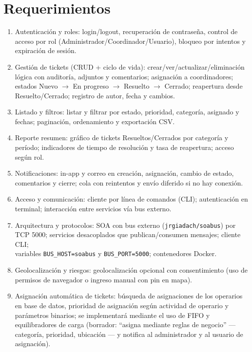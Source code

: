 \documentclass[letter,12pt]{article}
\begin{document}
\section{Requerimientos}
\begin{enumerate}[leftmargin=*]
    \item Autenticación y roles: login/logout, recuperación de contraseña, control de acceso por rol (Administrador/Coordinador/Usuario), bloqueo por intentos y expiración de sesión.
    \item Gestión de tickets (CRUD + ciclo de vida): crear/ver/actualizar/eliminación lógica con auditoría, adjuntos y comentarios; asignación a coordinadores; estados Nuevo $\rightarrow$ En progreso $\rightarrow$ Resuelto $\rightarrow$ Cerrado; reapertura desde Resuelto/Cerrado; registro de autor, fecha y cambios.
    \item Listado y filtros: listar y filtrar por estado, prioridad, categoría, asignado y fechas; paginación, ordenamiento y exportación CSV.
    \item Reporte resumen: gráfico de tickets Resueltos/Cerrados por categoría y período; indicadores de tiempo de resolución y tasa de reapertura; acceso según rol.
    \item Notificaciones: in-app y correo en creación, asignación, cambio de estado, comentarios y cierre; cola con reintentos y envío diferido si no hay conexión.
    \item Acceso y comunicación: cliente por línea de comandos (CLI); autenticación en terminal; interacción entre servicios vía bus externo.
    \item Arquitectura y protocolos: SOA con bus externo (\texttt{jrgiadach/soabus}) por TCP 5000; servicios desacoplados que publican/consumen mensajes; cliente CLI;\\
    \hspace*{1.5em}variables \texttt{BUS\_HOST=soabus} y \texttt{BUS\_PORT=5000}; contenedores Docker.
    \item Geolocalización y riesgos: geolocalización opcional con consentimiento (uso de permisos de navegador o ingreso manual con pin en mapa).
    \item Asignación automática de tickets: búsqueda de asignaciones de los operarios en base de datos, prioridad de asignación según actividad de operario y parámetros binarios; se implementará mediante el uso de FIFO y equilibradores de carga (borrador: ``asigna mediante reglas de negocio'' — categoría, prioridad, ubicación — y notifica al administrador y al usuario de asignación).
\end{enumerate}
\end{document}
